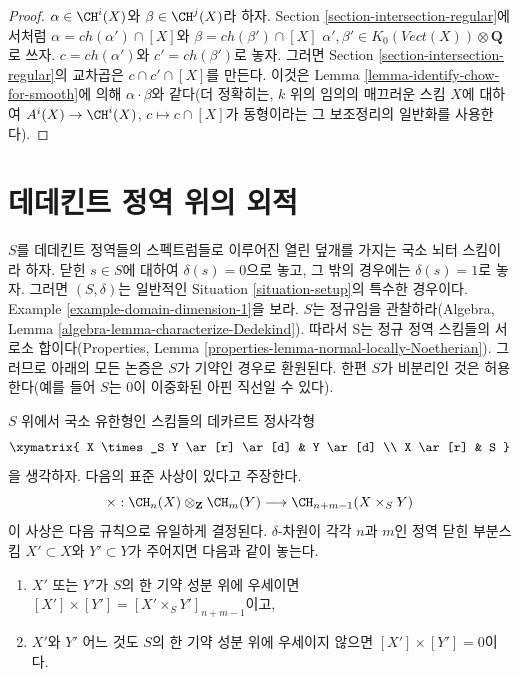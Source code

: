 \begin{proof}
$\alpha \in \CH^i(X)$와 $\beta \in \CH^j(X)$라 하자. Section
\ref{section-intersection-regular}에서처럼
$\alpha = ch(\alpha') \cap [X]$와 $\beta = ch(\beta') \cap [X]$
$\alpha', \beta' \in K_0(\textit{Vect}(X)) \otimes \mathbf{Q}$로 쓰자.
$c = ch(\alpha')$와 $c' = ch(\beta')$로 놓자. 그러면 Section
\ref{section-intersection-regular}의 교차곱은
$c \cap c' \cap [X]$를 만든다. 이것은 Lemma
\ref{lemma-identify-chow-for-smooth}에 의해
$\alpha \cdot \beta$와 같다(더 정확히는, $k$ 위의 임의의 매끄러운
스킴 $X$에 대하여 $A^i(X) \to \CH^i(X)$,
$c \mapsto c \cap [X]$가 동형이라는 그 보조정리의 일반화를
사용한다).
\end{proof}







\section{데데킨트 정역 위의 외적}
\label{section-exterior-product-dim-1}

\noindent
$S$를 데데킨트 정역들의 스펙트럼들로 이루어진 열린 덮개를 가지는
국소 뇌터 스킴이라 하자. 닫힌 $s \in S$에 대하여
$\delta(s) = 0$으로 놓고, 그 밖의 경우에는 $\delta(s) = 1$로 놓자.
그러면 $(S, \delta)$는 일반적인 Situation \ref{situation-setup}의
특수한 경우이다. Example \ref{example-domain-dimension-1}을 보라.
$S$는 정규임을 관찰하라(Algebra, Lemma
\ref{algebra-lemma-characterize-Dedekind}). 따라서 S는 정규 정역
스킴들의 서로소 합이다(Properties, Lemma
\ref{properties-lemma-normal-locally-Noetherian}). 그러므로 아래의
모든 논증은 $S$가 기약인 경우로 환원된다. 한편 $S$가 비분리인 것은
허용한다(예를 들어 $S$는 $0$이 이중화된 아핀 직선일 수 있다).

\medskip\noindent
$S$ 위에서 국소 유한형인 스킴들의 데카르트 정사각형
$$
\xymatrix{
X \times_S Y \ar[r] \ar[d] & Y \ar[d] \\
X \ar[r] & S
}
$$
을 생각하자. 다음의 표준 사상이 있다고 주장한다.
$$
\times :
\CH_n(X) \otimes_{\mathbf{Z}} \CH_m(Y)
\longrightarrow
\CH_{n + m - 1}(X \times_S Y)
$$
이 사상은 다음 규칙으로 유일하게 결정된다. $\delta$-차원이 각각
$n$과 $m$인 정역 닫힌 부분스킴 $X' \subset X$와 $Y' \subset Y$가
주어지면 다음과 같이 놓는다.
\begin{enumerate}
\item $X'$ 또는 $Y'$가 $S$의 한 기약 성분 위에 우세이면
$[X'] \times [Y'] = [X' \times_S Y']_{n + m - 1}$이고,
\item $X'$와 $Y'$ 어느 것도 $S$의 한 기약 성분 위에 우세이지 않으면
$[X'] \times [Y'] = 0$이다.
\end{enumerate}

